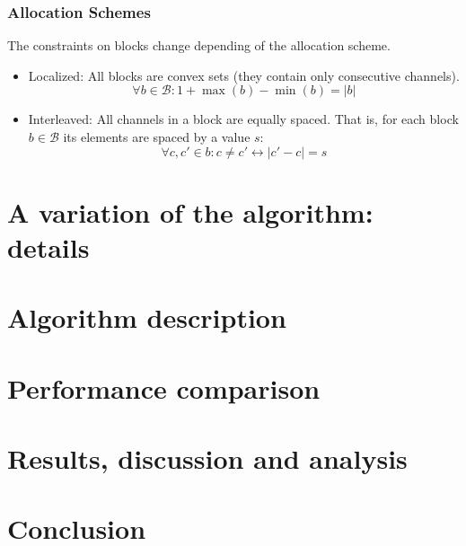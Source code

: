 \documentclass[a4paper, 10pt]{article}
\begin{document}
\subsubsection*{Allocation Schemes}
The constraints on blocks change depending of the allocation scheme.
\begin{itemize}
    \item Localized: All blocks are convex sets (they contain only
            consecutive channels). 
    \begin{equation*}
    \forall b \in \mathcal{B}: 1 + \max(b) - \min(b) = |b|
    \end{equation*}
    \item Interleaved: All channels in a block are equally spaced. 
    That is, for each block $b \in \mathcal{B}$ its elements are spaced by a value $s$: 
    \begin{equation*}
        \forall c, c' \in b : c \neq c' \leftrightarrow |c' - c| = s
    \end{equation*}
\end{itemize}

\section{A variation of the algorithm: details}

\section{Algorithm description}

\section{Performance comparison}

\section{Results, discussion and analysis}

\section{Conclusion}



\end{document}
